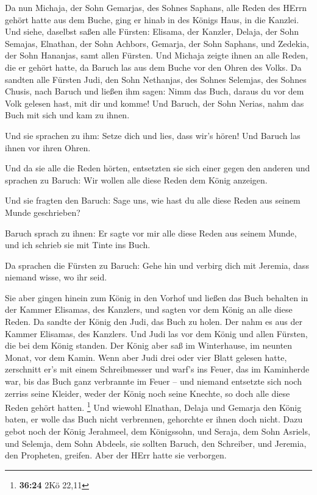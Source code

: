  Da nun Michaja, der Sohn Gemarjas, des Sohnes Saphans,
alle Reden des HErrn gehört hatte aus dem Buche,  ging er
hinab in des Königs Haus, in die Kanzlei. Und siehe, daselbst saßen alle
Fürsten: Elisama, der Kanzler, Delaja, der Sohn Semajas, Elnathan, der
Sohn Achbors, Gemarja, der Sohn Saphans, und Zedekia, der Sohn Hananjas,
samt allen Fürsten.  Und Michaja zeigte ihnen an alle
Reden, die er gehört hatte, da Baruch las aus dem Buche vor den Ohren
des Volks.  Da sandten alle Fürsten Judi, den Sohn
Nethanjas, des Sohnes Selemjas, des Sohnes Chusis, nach Baruch und
ließen ihm sagen: Nimm das Buch, daraus du vor dem Volk gelesen hast,
mit dir und komme! Und Baruch, der Sohn Nerias, nahm das Buch mit sich
und kam zu ihnen.

 Und sie sprachen zu ihm: Setze dich und lies, dass wir's
hören! Und Baruch las ihnen vor ihren Ohren.

 Und da sie alle die Reden hörten, entsetzten sie sich
einer gegen den anderen und sprachen zu Baruch: Wir wollen alle diese
Reden dem König anzeigen.

 Und sie fragten den Baruch: Sage uns, wie hast du alle
diese Reden aus seinem Munde geschrieben?

 Baruch sprach zu ihnen: Er sagte vor mir alle diese Reden
aus seinem Munde, und ich schrieb sie mit Tinte ins Buch.

 Da sprachen die Fürsten zu Baruch: Gehe hin und verbirg
dich mit Jeremia, dass niemand wisse, wo ihr seid.

 Sie aber gingen hinein zum König in den Vorhof und ließen
das Buch behalten in der Kammer Elisamas, des Kanzlers, und sagten vor
dem König an alle diese Reden.  Da sandte der König den
Judi, das Buch zu holen. Der nahm es aus der Kammer Elisamas, des
Kanzlers. Und Judi las vor dem König und allen Fürsten, die bei dem
König standen.  Der König aber saß im Winterhause, im
neunten Monat, vor dem Kamin.  Wenn aber Judi drei oder
vier Blatt gelesen hatte, zerschnitt er's mit einem Schreibmesser und
warf's ins Feuer, das im Kaminherde war, bis das Buch ganz verbrannte im
Feuer --  und niemand entsetzte sich noch zerriss seine
Kleider, weder der König noch seine Knechte, so doch alle diese Reden
gehört hatten. \footnote{\textbf{36:24} 2Kö 22,11}  Und
wiewohl Elnathan, Delaja und Gemarja den König baten, er wolle das Buch
nicht verbrennen, gehorchte er ihnen doch nicht.  Dazu
gebot noch der König Jerahmeel, dem Königssohn, und Seraja, dem Sohn
Asriels, und Selemja, dem Sohn Abdeels, sie sollten Baruch, den
Schreiber, und Jeremia, den Propheten, greifen. Aber der HErr hatte sie
verborgen.


